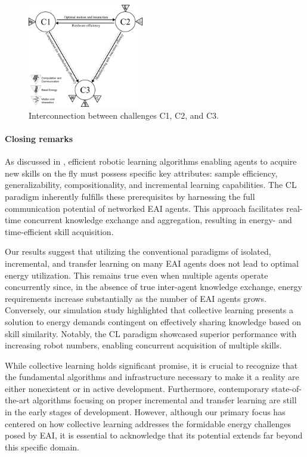 \documentclass[12pt]{article}
\begin{document}
\begin{figure}[!t]
	\centering
	\includegraphics[width=0.45\textwidth]{fig/grand_challenges_connections.png}
	\caption{Interconnection between challenges C1, C2, and C3.}
	\label{fig:challengesConnected}
\end{figure}

\paragraph*{Closing remarks}
As discussed in \cite{Kaelbling2020foundationefficientrobot}, efficient robotic learning algorithms enabling agents to acquire new skills on the fly must possess specific key attributes: sample efficiency, generalizability, compositionality, and incremental learning capabilities. The CL paradigm inherently fulfills these prerequisites by harnessing the full communication potential of networked EAI agents. This approach facilitates real-time concurrent knowledge exchange and aggregation, resulting in energy- and time-efficient skill acquisition.

Our results suggest that utilizing the conventional paradigms of isolated, incremental, and transfer learning on many EAI agents does not lead to optimal energy utilization. This remains true even when multiple agents operate concurrently since, in the absence of true inter-agent knowledge exchange, energy requirements increase substantially as the number of EAI agents grows. Conversely, our simulation study highlighted that collective learning presents a solution to energy demands contingent on effectively sharing knowledge based on skill similarity. Notably, the CL paradigm showcased superior performance with increasing robot numbers, enabling concurrent acquisition of multiple skills.

While collective learning holds significant promise, it is crucial to recognize that the fundamental algorithms and infrastructure necessary to make it a reality are either nonexistent or in active development. Furthermore, contemporary state-of-the-art algorithms focusing on proper incremental and transfer learning are still in the early stages of development. However, although our primary focus has centered on how collective learning addresses the formidable energy challenges posed by EAI, it is essential to acknowledge that its potential extends far beyond this specific domain.
\end{document}
